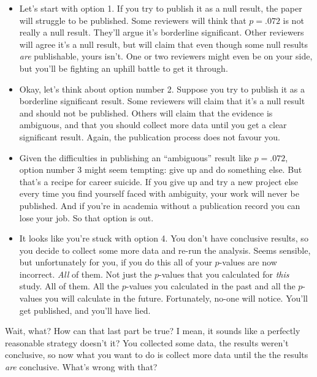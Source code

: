 \begin{itemize}
\item Let's start with option 1. If you try to publish it as a null result, the paper will struggle to be published. Some reviewers will think that $p=.072$ is not really a null result. They'll argue it's borderline significant. Other reviewers will agree it's a null result, but will claim that even though some null results {\it are} publishable, yours isn't. One or two reviewers might even be on your side, but you'll be fighting an uphill battle to get it through.

\item Okay, let's think about option number 2. Suppose you try to publish it as a borderline significant result. Some reviewers will claim that it's a null result and should not be published. Others will claim that the evidence is ambiguous, and that you should collect more data until you get a clear significant result. Again, the publication process does not favour you.

\item Given the difficulties in publishing an ``ambiguous'' result like $p=.072$, option number 3 might seem tempting: give up and do something else. But that's a recipe for career suicide. If you give up and try a new project else every time you find yourself faced with ambiguity, your work will never be published. And if you're in academia without a publication record you can lose your job. So that option is out.

\item It looks like you're stuck with option 4. You don't have conclusive results, so you decide to collect some more data and re-run the analysis. Seems sensible, but unfortunately for you, if you do this all of your $p$-values are now incorrect. {\it All} of them. Not just the $p$-values that you calculated for {\it this} study. All of them. All the $p$-values you calculated in the past and all the $p$-values you will calculate in the future. Fortunately, no-one will notice. You'll get published, and you'll have lied.

\end{itemize}

\noindent
Wait, what? How can that last part be true? I mean, it sounds like a perfectly reasonable strategy doesn't it? You collected some data, the results weren't conclusive, so now what you want to do is collect more data until the the results {\it are} conclusive. What's wrong with that?

